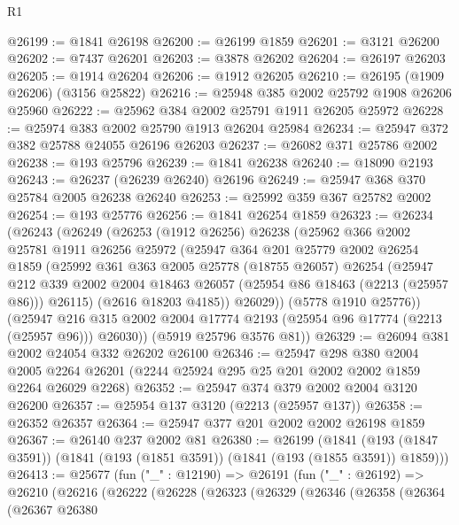 \begin{lexlean}{R1}
\begin{coremodule}
@26199 := @1841 @26198
@26200 := @26199 @1859
@26201 := @3121 @26200
@26202 := @7437 @26201
@26203 := @3878 @26202
@26204 := @26197 @26203
@26205 := @1914 @26204
@26206 := @1912 @26205
@26210 := @26195 (@1909 @26206) (@3156 @25822)
@26216 := @25948 @385 @2002 @25792 @1908 @26206 @25960
@26222 := @25962 @384 @2002 @25791 @1911 @26205 @25972
@26228 := @25974 @383 @2002 @25790 @1913 @26204 @25984
@26234 := @25947 @372 @382 @25788 @24055 @26196 @26203
@26237 := @26082 @371 @25786 @2002
@26238 := @193 @25796
@26239 := @1841 @26238
@26240 := @18090 @2193
@26243 := @26237 (@26239 @26240) @26196
@26249 := @25947 @368 @370 @25784 @2005 @26238 @26240
@26253 := @25992 @359 @367 @25782 @2002
@26254 := @193 @25776
@26256 := @1841 @26254 @1859
@26323 := @26234
    (@26243
      (@26249
        (@26253
          (@1912 @26256)
          @26238
          (@25962
            @366
            @2002
            @25781
            @1911
            @26256
            @25972
            (@25947
              @364
              @201
              @25779
              @2002
              @26254
              @1859
              (@25992
                @361
                @363
                @2005
                @25778
                (@18755 @26057)
                @26254
                (@25947
                  @212
                  @339
                  @2002
                  @2004
                  @18463
                  @26057
                  (@25954 @86 @18463 (@2213 (@25957 @86)))
                  @26115)
                (@2616 @18203 @4185))
              @26029))
          (@5778 @1910 @25776))
        (@25947 @216 @315 @2002 @2004 @17774 @2193 (@25954 @96 @17774 (@2213 (@25957 @96))) @26030))
      (@5919 @25796 @3576 @81))
@26329 := @26094 @381 @2002 @24054 @332 @26202 @26100
@26346 := @25947
    @298
    @380
    @2004
    @2005
    @2264
    @26201
    (@2244 @25924 @295 @25 @201 @2002 @2002 @1859 @2264 @26029 @2268)
@26352 := @25947 @374 @379 @2002 @2004 @3120 @26200
@26357 := @25954 @137 @3120 (@2213 (@25957 @137))
@26358 := @26352 @26357
@26364 := @25947 @377 @201 @2002 @2002 @26198 @1859
@26367 := @26140 @237 @2002 @81
@26380 := @26199
    (@1841 (@193 (@1847 @3591)) (@1841 (@193 (@1851 @3591)) (@1841 (@193 (@1855 @3591)) @1859)))
@26413 := @25677
    (fun ("_" : @12190) =>
    @26191
      (fun ("_" : @26192) =>
      @26210
        (@26216
          (@26222
            (@26228
              (@26323
                (@26329
                  (@26346
                    (@26358
                      (@26364
                        (@26367
                          @26380

\end{coremodule}
\end{lexlean}
